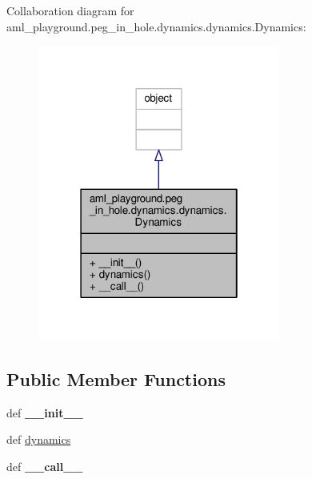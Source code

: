 Collaboration diagram for aml\-\_\-playground.\-peg\-\_\-in\-\_\-hole.\-dynamics.\-dynamics.\-Dynamics\-:\nopagebreak
\begin{figure}[H]
\begin{center}
\leavevmode
\includegraphics[width=226pt]{classaml__playground_1_1peg__in__hole_1_1dynamics_1_1dynamics_1_1_dynamics__coll__graph}
\end{center}
\end{figure}
\subsection*{Public Member Functions}
\begin{DoxyCompactItemize}
\item 
\hypertarget{classaml__playground_1_1peg__in__hole_1_1dynamics_1_1dynamics_1_1_dynamics_ae6f9de7c2ee1a304065c6a8664364773}{def {\bfseries \-\_\-\-\_\-init\-\_\-\-\_\-}}\label{classaml__playground_1_1peg__in__hole_1_1dynamics_1_1dynamics_1_1_dynamics_ae6f9de7c2ee1a304065c6a8664364773}

\item 
def \hyperlink{classaml__playground_1_1peg__in__hole_1_1dynamics_1_1dynamics_1_1_dynamics_a3a69bd154a9b4dad327611e6f3731ffe}{dynamics}
\item 
\hypertarget{classaml__playground_1_1peg__in__hole_1_1dynamics_1_1dynamics_1_1_dynamics_a4474de680879bd3da0fc29c1fa7cffbb}{def {\bfseries \-\_\-\-\_\-call\-\_\-\-\_\-}}\label{classaml__playground_1_1peg__in__hole_1_1dynamics_1_1dynamics_1_1_dynamics_a4474de680879bd3da0fc29c1fa7cffbb}

\end{DoxyCompactItemize}


